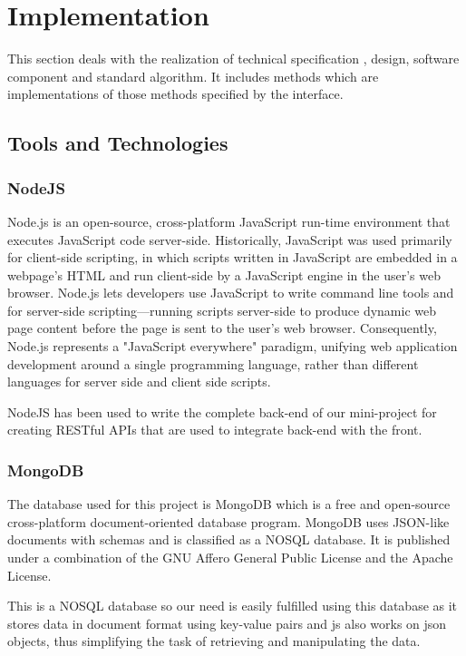 \chapter{Implementation}
This section deals with the realization of technical specification , design, software component and standard algorithm. It includes methods which are implementations of those methods specified by the interface.

\section{Tools and Technologies}

\subsection{NodeJS}

Node.js is an open-source, cross-platform JavaScript run-time environment that executes JavaScript code server-side. Historically, JavaScript was used primarily for client-side scripting, in which scripts written in JavaScript are embedded in a webpage's HTML and run client-side by a JavaScript engine in the user's web browser. Node.js lets developers use JavaScript to write command line tools and for server-side scripting—running scripts server-side to produce dynamic web page content before the page is sent to the user's web browser. Consequently, Node.js represents a "JavaScript everywhere" paradigm, unifying web application development around a single programming language, rather than different languages for server side and client side scripts. 

NodeJS has been used to write the complete back-end of our mini-project for creating RESTful APIs that are used to integrate back-end with the front.  

\subsection{MongoDB}

The database used for this project is MongoDB which is a free and open-source cross-platform document-oriented database program. MongoDB uses JSON-like documents with schemas and is classified as a NOSQL database. It is published under a combination of the GNU Affero General Public License and the Apache License.

This is a NOSQL database so our need is easily fulfilled using this database as it stores data in document format using key-value pairs and js also works on json objects, thus simplifying the task of retrieving and manipulating the data.

